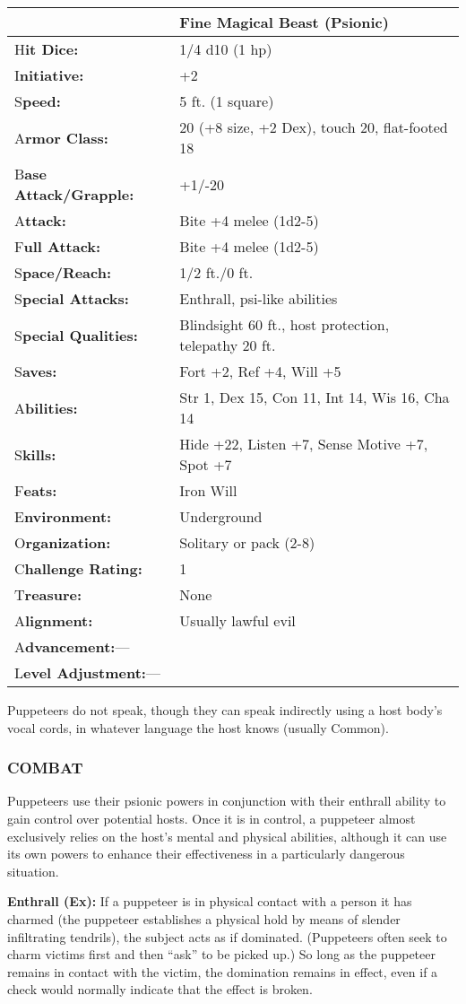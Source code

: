 \documentclass{article}
\begin{document}
\begin{tabular}{|>{\raggedright}p{91pt}|>{\raggedright}p{194pt}|}
\hline
  & Fine Magical Beast (Psionic)\tabularnewline
\hline
H\textbf{it Dice:} & 1/4 d10 (1 hp)\tabularnewline
\hline
I\textbf{nitiative:} & +2\tabularnewline
\hline
S\textbf{peed:} & 5 ft. (1 square)\tabularnewline
\hline
A\textbf{rmor Class:} & 20 (+8 size, +2 Dex), touch 20, flat-footed 18\tabularnewline
\hline
B\textbf{ase Attack/Grapple:} & +1/-20\tabularnewline
\hline
A\textbf{ttack:} & Bite +4 melee (1d2-5)\tabularnewline
\hline
F\textbf{ull Attack:} & Bite +4 melee (1d2-5)\tabularnewline
\hline
S\textbf{pace/Reach:} & 1/2 ft./0 ft.\tabularnewline
\hline
S\textbf{pecial Attacks:} & Enthrall, psi-like abilities\tabularnewline
\hline
S\textbf{pecial Qualities:} & Blindsight 60 ft., host protection, telepathy 20 
ft. \tabularnewline
\hline
S\textbf{aves:} & Fort +2, Ref +4, Will +5\tabularnewline
\hline
A\textbf{bilities:} & Str 1, Dex 15, Con 11, Int 14, Wis 16, Cha 14\tabularnewline
\hline
S\textbf{kills:} & Hide +22, Listen +7, Sense Motive +7, Spot +7\tabularnewline
\hline
F\textbf{eats:} & Iron Will\tabularnewline
\hline
E\textbf{nvironment:} & Underground\tabularnewline
\hline
O\textbf{rganization:} & Solitary or pack (2-8)\tabularnewline
\hline
C\textbf{hallenge Rating:} & 1\tabularnewline
\hline
T\textbf{reasure:} & None\tabularnewline
\hline
A\textbf{lignment:} & Usually lawful evil\tabularnewline
\hline
A\textbf{dvancement:}--- & \tabularnewline
\hline
L\textbf{evel Adjustment:}--- & \tabularnewline
\hline
\end{tabular}

Puppeteers do not speak, though they can speak indirectly using a host body's vocal 
cords, in whatever language the host knows (usually Common).

\subsubsection*{COMBAT }

Puppeteers use their psionic powers in conjunction with their enthrall ability 
to gain control over potential hosts. Once it is in control, a puppeteer almost 
exclusively relies on the host's mental and physical abilities, although it can 
use its own powers to enhance their effectiveness in a particularly dangerous situation.

\textbf{Enthrall (Ex):} If a puppeteer is in physical contact with a person it 
has charmed (the puppeteer establishes a physical hold by means of slender infiltrating 
tendrils), the subject acts as if dominated. (Puppeteers often seek to charm victims 
first and then ``ask'' to be picked up.) So long as the puppeteer remains in contact 
with the victim, the domination remains in effect, even if a check would normally 
indicate that the effect is broken.
\end{document}
